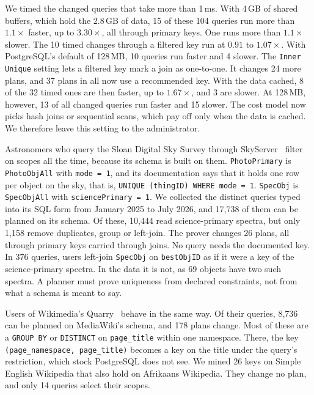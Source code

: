 \documentclass[conference]{IEEEtran}
\theoremstyle{definition}
\newcommand{\sql}[1]{\texttt{#1}}
\newif\ifextended
\begin{document}
We timed the changed queries that take more than 1\,ms. With 4\,GB of shared buffers, which hold the 2.8\,GB of data,
15 of these 104 queries run more than $1.1\times$ faster, up to $3.30\times$, all through primary keys. One runs more
than $1.1\times$ slower. The 10 timed changes through a filtered key run at $0.91$ to $1.07\times$. With PostgreSQL's
default of 128\,MB, 10 queries run faster and 4 slower. The \sql{Inner Unique} setting lets a filtered key mark a join as
one-to-one. It changes 24 more plans, and 37 plans in all now use a recommended key. With the data cached, 8 of the 32
timed ones are then faster, up to $1.67\times$, and 3 are slower. At 128\,MB, however, 13 of all changed queries run faster
and 15 slower. The cost model now picks hash joins or sequential scans, which pay off only when the data is cached. We
therefore leave this setting to the administrator.

\fi
\ifextended
Astronomers who query the Sloan Digital Sky Survey through SkyServer~\cite{SkyServer} filter on scopes all the
time, because its schema is built on them. \sql{PhotoPrimary} is \sql{PhotoObjAll} with \sql{mode = 1}, and its
documentation says that it holds one row per object on the sky, that is, \sql{UNIQUE (thingID) WHERE mode = 1}.
\sql{SpecObj} is \sql{SpecObjAll} with \sql{sciencePrimary = 1}. We collected the distinct queries typed into its SQL form
from January 2025 to July 2026, and 17{,}738 of them can be planned on its schema. Of these, 10{,}444 read
science-primary spectra, but only 1{,}158 remove duplicates, group or left-join. The prover changes 26 plans, all through
primary keys carried through joins. No query needs the documented key. In 376 queries, users left-join \sql{SpecObj} on
\sql{bestObjID} as if it were a key of the science-primary spectra. In the data it is not, as 69 objects have two such
spectra. A planner must prove uniqueness from declared constraints, not from what a schema is meant to say.

Users of Wikimedia's Quarry~\cite{Quarry} behave in the same way. Of their queries, 8{,}736 can be planned on
MediaWiki's schema, and 178 plans change. Most of these are a \sql{GROUP BY} or \sql{DISTINCT} on \sql{page\_title} within
one namespace. There, the key \sql{(page\_namespace, page\_title)} becomes a key on the title under the query's
restriction, which stock PostgreSQL does not see. We mined 26 keys on Simple English Wikipedia that also hold on Afrikaans
Wikipedia. They change no plan, and only 14 queries select their scopes.
\end{document}
